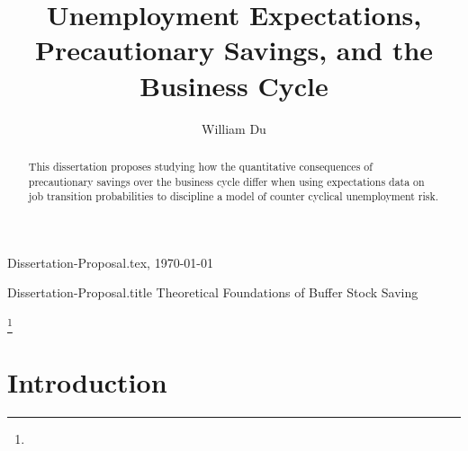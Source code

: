 \documentclass[titlepage]{\econtex}\providecommand{\texname}{Dissertation-Proposal}
\providecommand{\onlyinsubfile}{}
\providecommand{\notinsubfile}{}
\renewcommand{\onlyinsubfile}[1]{}
\renewcommand{\notinsubfile}[1]{#1}
\begin{document}

\renewcommand{\onlyinsubfile}[1]{}\renewcommand{\notinsubfile}[1]{#1} 

\hfill{\tiny \texname.tex, \today}

\begin{verbatimwrite}{\texname.title}
Theoretical Foundations of Buffer Stock Saving
\end{verbatimwrite}


\title{Unemployment Expectations, Precautionary Savings, and the Business Cycle}

\author{William Du\authNum}







\maketitle 


\hypertarget{abstract}{}
\begin{abstract}
This dissertation proposes studying how the quantitative consequences of precautionary savings over the business cycle differ when using expectations data on job transition probabilities to discipline a model of counter cyclical unemployment risk.
\end{abstract}


\begin{authorsinfo}
\end{authorsinfo}

\thanks{ }

\titlepagefinish


\newtheorem{defn}{Definition}
\newtheorem{theorem}{Theorem}

\hypertarget{Introduction}{}
\section{Introduction}

\label{sec:intro}
\end{document}

